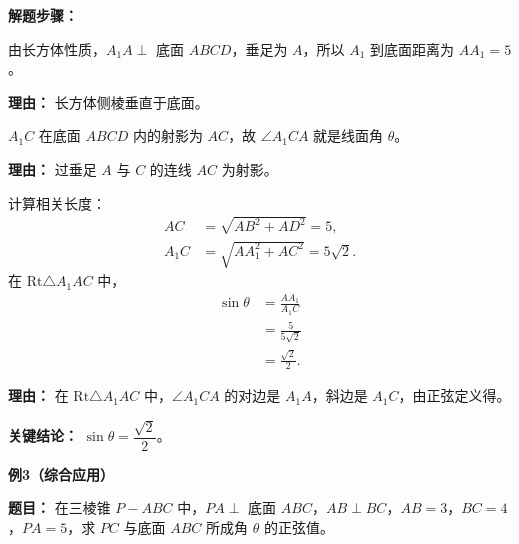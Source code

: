 \begin{examplebox}
	\textbf{\textcolor{CExample}{解题步骤：}}
	\begin{description}[style=nextline, leftmargin=2.8em, labelsep=0.5em, itemsep=0.45em]
		\item[\textbf{第一步（作垂线）：}] 由长方体性质，$A_1A \perp$ 底面 $ABCD$，垂足为 $A$，所以 $A_1$ 到底面距离为 $AA_1=5$。
			\par\textbf{理由：} 长方体侧棱垂直于底面。
		\item[\textbf{第二步（确定射影）：}] $A_1C$ 在底面 $ABCD$ 内的射影为 $AC$，故 $\angle A_1CA$ 就是线面角 $\theta$。
			\par\textbf{理由：} 过垂足 $A$ 与 $C$ 的连线 $AC$ 为射影。
		\item[\textbf{第三步（计算正弦）：}]
			计算相关长度：
			\[
				\begin{aligned}
					AC &= \sqrt{AB^2+AD^2}=5,\\
					A_1C &= \sqrt{AA_1^2+AC^2}=5\sqrt{2}.
			\end{aligned}
			\]
			在 $\mathrm{Rt}\triangle A_1AC$ 中，
			\[
				\begin{aligned}
					\sin\theta &= \frac{AA_1}{A_1C} \\
					&= \frac{5}{5\sqrt{2}} \\
					&= \frac{\sqrt{2}}{2}.
			\end{aligned}
			\]
			\par\textbf{理由：} 在 $\mathrm{Rt}\triangle A_1AC$ 中，$\angle A_1CA$ 的对边是 $A_1A$，斜边是 $A_1C$，由正弦定义得。
	\end{description}

	\textbf{\textcolor{CExample}{关键结论：}}
	\textbf{$\sin\theta = \dfrac{\sqrt{2}}{2}$}。

	\medskip
	\textbf{\textcolor{CExample}{例3（综合应用）}}

	\textbf{\textcolor{CExample}{题目：}}
	在三棱锥 $P-ABC$ 中，$PA \perp$ 底面 $ABC$，$AB \perp BC$，$AB=3$，$BC=4$，$PA=5$，求 $PC$ 与底面 $ABC$ 所成角 $\theta$ 的正弦值。


\end{examplebox}
